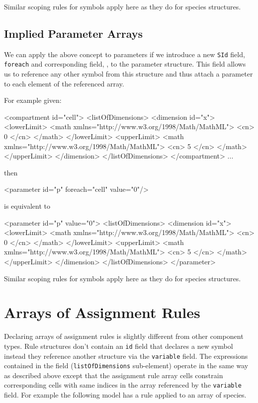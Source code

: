 \documentclass{cekarticle}
\begin{document}
Similar scoping rules for symbols apply here as they do for species structures.

\subsection{Implied Parameter Arrays}

We can apply the above concept to parameters if we introduce a
new \texttt{SId} field, \texttt{foreach} and corresponding  field, , to the parameter
structure. This field allows us to reference any other symbol
from this structure and thus attach a parameter to each element
of the referenced array.

For example given:
\begin{example}
<compartment id="cell">
    <listOfDimensions>
        <dimension id="x">
            <lowerLimit>
                <math xmlns="http://www.w3.org/1998/Math/MathML">
                    <cn> 0 </cn>
                </math>
            </lowerLimit>
            <upperLimit>
                <math xmlns="http://www.w3.org/1998/Math/MathML">
                    <cn> 5 </cn>
                </math>
            </upperLimit>
        </dimension>
    </listOfDimensions>
</compartment>
...
\end{example}
then
\begin{example}
<parameter id="p" foreach="cell" value="0"/>
\end{example}
is equivalent to
\begin{example}
<parameter id="p" value="0">
    <listOfDimensions>
        <dimension id="x">
            <lowerLimit>
                <math xmlns="http://www.w3.org/1998/Math/MathML">
                    <cn> 0 </cn>
                </math>
            </lowerLimit>
            <upperLimit>
                <math xmlns="http://www.w3.org/1998/Math/MathML">
                    <cn> 5 </cn>
                </math>
            </upperLimit>
        </dimension>
    </listOfDimensions>
</parameter>
\end{example}

Similar scoping rules for symbols apply here as they do for species structures.

\section{Arrays of Assignment Rules}

Declaring arrays of assignment rules is slightly different from other component types.
Rule structures don't contain an \texttt{id}
field that declares a new symbol instead they reference another
structure via the \texttt{variable} field.  The
expressions contained in the  field
(\texttt{listOfDimensions} sub-element) operate in the same way as described above except
that the assignment rule array cells constrain corresponding cells with same indices
in the array referenced by the \texttt{variable} field.
For example the following model has a rule applied to an array of species.
\end{document}
